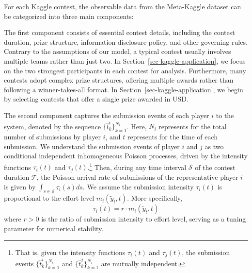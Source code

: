 \documentclass[mnsc]{informs3}
\begin{document}
For each Kaggle contest, the observable data from the Meta-Kaggle dataset can be categorized into three main components:

The first component consists of essential contest details, including the contest duration, prize structure, information disclosure policy, and other governing rules.
Contrary to the assumptions of our model, a typical contest usually involves multiple teams rather than just two.
In Section~\ref{sec-kaggle-application}, we focus on the two strongest participants in each contest for analysis.
Furthermore, many contests adopt complex prize structures, offering multiple awards rather than following a winner-takes-all format.
In Section~\ref{sec-kaggle-application}, we begin by selecting contests that offer a single prize awarded in USD.

The second component captures the submission events of each player $i$ to the system, denoted by the sequence $\{\hat{t}^i_k\}_{k=1}^{N_i}$.
Here, $N_i$ represents for the total number of submissions by player $i$, and $t$ represents for the time of each submission. 
We understand the submission events of player $i$ and $j$ as two conditional independent inhomogeneous Poisson processes, driven by the intensity functions $\tau_i(t)$ and $\tau_j(t)$.\footnote{That is, given the intensity functions $\tau_i(t)$ and $\tau_j(t)$, the submission events $\{\hat{t}^i_k\}_{k=1}^{N_i}$ and $\{\hat{t}^j_k\}_{k=1}^{N_i}$ are mutually independent.}
Then, during any time interval $\mathcal{S}$ of the contest duration $\mathcal{T}$, the Poisson arrival rate of submissions of the representative player $i$ is given by $\int_{s\in\mathcal{S}}\tau_i(s)ds$. 
We assume the submission intensity $\tau_i(t)$ is proportional to the effort level $m_i(\tilde{y}_t, t)$. More specifically, 
\begin{equation}\label{eq-model-intensity}
\tau_i(t) = r \cdot m_i(\tilde{y}_t, t)
\end{equation}
where $r>0$ is the ratio of submission intensity to effort level, serving as a tuning parameter for numerical stability. 
\end{document}
